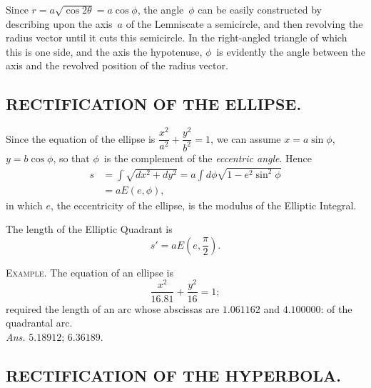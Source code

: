 \documentclass[12pt,leqno]{book}[2005/09/16]
\newcommand{\Section}[1]
  {\subsection*{\centering\normalfont\textsc{\MakeTextUppercase{\small#1}}}}
\newcommand{\Example}[1]{\textsc{Example#1}\quad}
\begin{document}
Since $r = a \sqrt{\cos 2\theta} = a \cos \phi$, the angle~$\phi$ can be easily
constructed by describing upon the axis~$a$ of the Lemniscate a
semicircle, and then revolving the radius vector until it cuts
this semicircle. In the right-angled triangle of which this is one
side, and the axis the hypotenuse, $\phi$~is evidently the angle between
the axis and the revolved position of the radius vector.


\Section{RECTIFICATION OF THE ELLIPSE.}

Since the equation of the ellipse is $\dfrac{x^{2}}{a^{2}} + \dfrac{y^{2}}{b^{2}} = 1$, we can
assume $x = a\sin \phi$, $y = b\cos \phi$, so that $\phi$~is the complement
of the \emph{eccentric angle}. Hence
\begin{align*}
s &= \int \sqrt{dx^{2} + dy^{2}}
   = a \int d\phi \sqrt{1 - e^{2} \sin^{2} \phi} \\
  &= aE(e, \phi),
\end{align*}
in which $e$, the eccentricity of the ellipse, is the modulus of the
Elliptic Integral.

The length of the Elliptic Quadrant is
\[
s' = aE\left(e, \frac{\pi}{2}\right).
\]

\Example. The equation of an ellipse is
\[ %
\frac{x^{2}}{16.81} + \dfrac{y^{2}}{16} = 1;
\]
required the length of an arc whose abscissas are $1.061162$ and
$4.100000$: of the quadrantal arc. \\
\null\hfill\textit{Ans.} $5.18912$; $6.36189$.


\Section{RECTIFICATION OF THE HYPERBOLA.}
\end{document}
